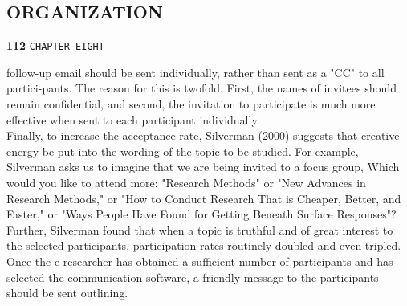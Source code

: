\documentclass[a4,9pt]{beamer}
\begin{document}
\begin{frame}
\section*{ORGANIZATION}
\begin{flushleft}
\hspace*{-0.5cm} \textbf{112}\hspace*{1cm} \texttt{CHAPTER EIGHT}
\end{flushleft}

\vspace*{0.5cm}
follow-up email should be sent individually, rather than sent as a "CC" to all partici-pants. The reason for this is twofold. First, the names of invitees should remain confidential, and second, the invitation to participate is much more effective when sent to each participant individually.\\
\hspace*{0.7cm} Finally, to increase the acceptance rate, Silverman (2000) suggests that creative energy be put into the wording of the topic to be studied. For example, Silverman asks us to imagine that we are being invited to a focus group, Which would you like to attend more: "Research Methods" or "New Advances in Research Methods," or "How to Conduct Research That is Cheaper, Better, and Faster," or "Ways People Have Found for Getting Beneath Surface Responses"? Further, Silverman found that when a topic is truthful and of great interest to the selected participants, participation rates routinely doubled and even tripled.\\
\hspace*{0.7cm} Once the e-researcher has obtained a sufficient number of participants and has selected the communication software, a friendly message to the participants should be sent outlining.\\

\vspace*{0.3cm}
\end{frame}
\end{document}
